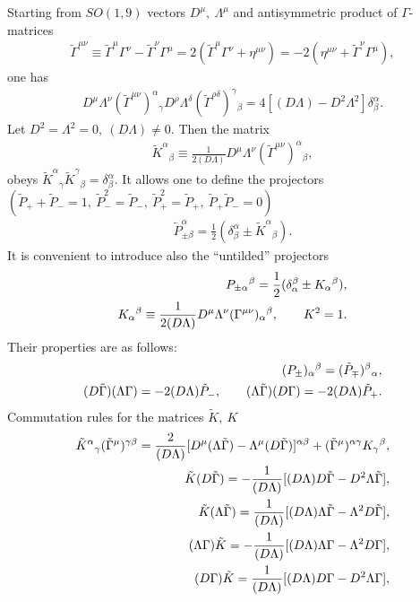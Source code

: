 \documentclass[a4paper]{article}
\begin{document}
Starting from $SO(1, 9)$ vectors $D^\mu, ~ \Lambda^\mu$ and 
antisymmetric product of $\Gamma$-matrices 
\begin{eqnarray}
\tilde\Gamma^{\mu\nu}\equiv\tilde\Gamma^\mu\Gamma^\nu-
\tilde\Gamma^\nu\Gamma^\mu=2(\tilde\Gamma^\mu\Gamma^\nu+\eta^{\mu\nu})=
-2(\eta^{\mu\nu}+\tilde\Gamma^\nu\Gamma^\mu),
\end{eqnarray}
one has
\begin{eqnarray}
D^\mu\Lambda^\nu(\tilde\Gamma^{\mu\nu})^\alpha{}_\gamma 
D^\rho\Lambda^\delta(\tilde\Gamma^{\rho\delta})^\gamma{}_\beta=
4[(D\Lambda)-D^2\Lambda^2]\delta^\alpha_\beta.
\end{eqnarray}
Let $D^2=\Lambda^2=0, ~ (D\Lambda)\ne 0$. Then the matrix 
\begin{eqnarray}
\tilde K^\alpha{}_\beta\equiv\frac{1}{2(D\Lambda)}D^\mu\Lambda^\nu
(\tilde\Gamma^{\mu\nu})^\alpha{}_\beta,
\end{eqnarray}
obeys $\tilde K^\alpha{}_\gamma\tilde K^\gamma{}_\beta=
\delta^\alpha_\beta$. It allows one to define the projectors 
$(\tilde P_++\tilde P_-=1, ~ \tilde P^2_-=\tilde P_-, ~ 
\tilde P^2_+=\tilde P_+, ~ \tilde P_+\tilde P_-=0)$ 
\begin{eqnarray}
\tilde P^\alpha_{\pm\beta}=
\frac 12(\delta^\alpha_\beta\pm\tilde K^\alpha{}_\beta). 
\end{eqnarray}
It is convenient to introduce also the ``untilded'' projectors
\begin{eqnarray}
P_{\pm\alpha}{}^\beta=
\frac 12(\delta_\alpha^\beta\pm K_\alpha{}^\beta), \cr
K_\alpha{}^\beta\equiv\frac{1}{2(D\Lambda)}D^\mu\Lambda^\nu
(\Gamma^{\mu\nu})_\alpha{}^\beta, \qquad K^2=1.
\end{eqnarray}
Their properties are as follows:
\begin{eqnarray}
(P_{\pm})_\alpha{}^\beta=(\tilde P_{\mp})^\beta{}_\alpha, \cr
(D\tilde\Gamma)(\Lambda\Gamma)=-2(D\Lambda)\tilde P_-, \qquad 
(\Lambda\tilde\Gamma)(D\Gamma)=-2(D\Lambda)\tilde P_+.
\end{eqnarray}
Commutation rules for the matrices $\tilde K, ~ K$ 
\begin{eqnarray}
\tilde K^\alpha{}_\gamma(\tilde\Gamma^\mu)^{\gamma\beta}=
\frac{2}{(D\Lambda)}[D^\mu(\Lambda\tilde\Gamma)-
\Lambda^\mu(D\tilde\Gamma)]^{\alpha\beta}+
(\tilde\Gamma^\mu)^{\alpha\gamma}K_\gamma{}^\beta, \cr
\tilde K(D\tilde\Gamma)=
-\frac{1}{(D\Lambda)}[(D\Lambda)D\tilde\Gamma-
D^2\Lambda\tilde\Gamma], \cr
\tilde K(\Lambda\tilde\Gamma)=
\frac{1}{(D\Lambda)}[(D\Lambda)\Lambda\tilde\Gamma-
\Lambda^2D\tilde\Gamma], \cr
(\Lambda\Gamma)\tilde K=-
\frac{1}{(D\Lambda)}[(D\Lambda)\Lambda\Gamma-
\Lambda^2D\Gamma], \cr
(D\Gamma)\tilde K=
\frac{1}{(D\Lambda)}[(D\Lambda)D\Gamma-
D^2\Lambda\Gamma], \cr
\end{eqnarray}
\end{document}

